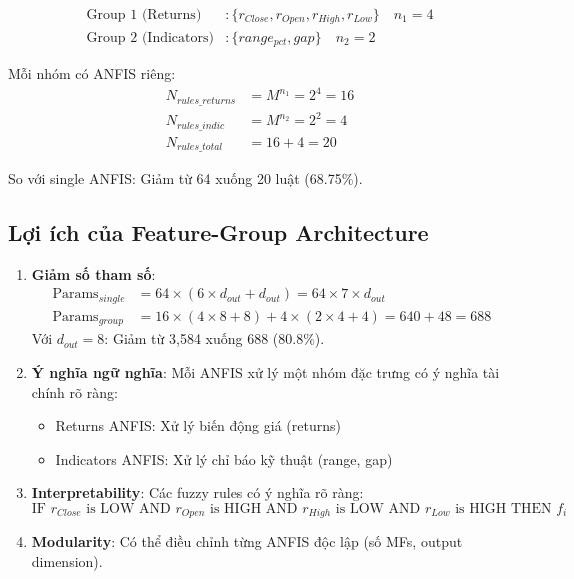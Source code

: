 \documentclass[12pt,a4paper]{article}
\begin{document}
\begin{align}
\text{Group 1 (Returns)} &: \{r_{Close}, r_{Open}, r_{High}, r_{Low}\} \quad n_1 = 4 \\
\text{Group 2 (Indicators)} &: \{range_{pct}, gap\} \quad n_2 = 2
\end{align}

Mỗi nhóm có ANFIS riêng:
\begin{align}
N_{rules\_returns} &= M^{n_1} = 2^4 = 16 \\
N_{rules\_indic} &= M^{n_2} = 2^2 = 4 \\
N_{rules\_total} &= 16 + 4 = 20
\end{align}

So với single ANFIS: Giảm từ 64 xuống 20 luật (68.75\%).

\subsection{Lợi ích của Feature-Group Architecture}

\begin{enumerate}
    \item \textbf{Giảm số tham số}: 
    \begin{align}
    \text{Params}_{single} &= 64 \times (6 \times d_{out} + d_{out}) = 64 \times 7 \times d_{out} \\
    \text{Params}_{group} &= 16 \times (4 \times 8 + 8) + 4 \times (2 \times 4 + 4) = 640 + 48 = 688
    \end{align}
    Với $d_{out}=8$: Giảm từ 3,584 xuống 688 (80.8\%).
    
    \item \textbf{Ý nghĩa ngữ nghĩa}: Mỗi ANFIS xử lý một nhóm đặc trưng có ý nghĩa tài chính rõ ràng:
    \begin{itemize}
        \item Returns ANFIS: Xử lý biến động giá (returns)
        \item Indicators ANFIS: Xử lý chỉ báo kỹ thuật (range, gap)
    \end{itemize}
    
    \item \textbf{Interpretability}: Các fuzzy rules có ý nghĩa rõ ràng:
    \begin{equation}
    \text{IF } r_{Close} \text{ is LOW AND } r_{Open} \text{ is HIGH AND } r_{High} \text{ is LOW AND } r_{Low} \text{ is HIGH THEN } f_i
    \end{equation}
    
    \item \textbf{Modularity}: Có thể điều chỉnh từng ANFIS độc lập (số MFs, output dimension).
\end{enumerate}
\end{document}
